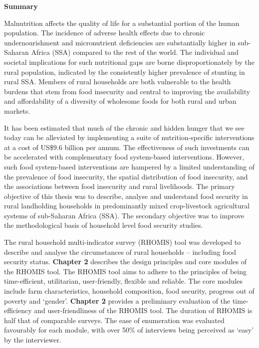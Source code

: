 {\Large\textbf{Summary}}
\label{cha:Summary}

Malnutrition affects the quality of life for a substantial portion of the human population. The incidence of adverse health effects due to chronic undernourishment and micronutrient deficiencies are substantially higher in sub-Saharan Africa (SSA) compared to the rest of the world. The individual and societal implications for such nutritional gaps are borne disproportionately by the rural population, indicated by the consistently higher prevalence of stunting in rural SSA. Members of rural households are both vulnerable to the health burdens that stem from food insecurity and central to improving the availability and affordability of a diversity of wholesome foods for both rural and urban markets.

It has been estimated that much of the chronic and hidden hunger that we see today can be alleviated by implementing a suite of nutrition-specific interventions at a cost of US\$9.6 billion per annum. The effectiveness of such investments can be accelerated with complementary food system-based interventions. However, such food system-based interventions are hampered by a limited understanding of the prevalence of food insecurity, the spatial distribution of food insecurity, and the associations between food insecurity and rural livelihoods. The primary objective of this thesis was to describe, analyse and understand food security in rural landholding households in predominantly mixed crop-livestock agricultural systems of sub-Saharan Africa (SSA). The secondary objective was to improve the methodological basis of household level food security studies.

The rural household multi-indicator survey (RHOMIS) tool was developed to describe and analyse the circumstances of rural households -- including food security status. \textbf{Chapter 2} describes the design principles and core modules of the RHOMIS tool. The RHOMIS tool aims to adhere to the principles of being time-efficient, utilitarian, user-friendly, flexible and reliable. The core modules include farm characteristics, household composition, food security, progress out of poverty and `gender'. \textbf{Chapter 2} provides a preliminary evaluation of the time-efficiency and user-friendliness of the RHOMIS tool. The duration of RHOMIS is half that of comparable surveys. The ease of enumeration was evaluated favourably for each module, with over 50\% of interviews being perceived as `easy' by the interviewer.


